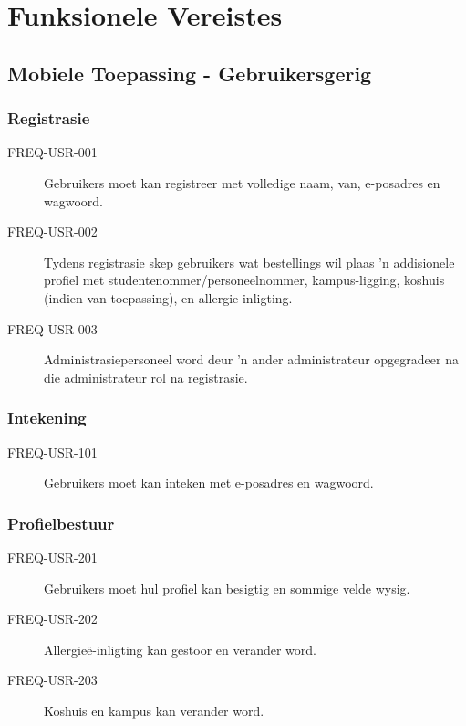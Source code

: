 \section{Funksionele Vereistes}

\subsection{Mobiele Toepassing - Gebruikersgerig}

\subsubsection{Registrasie}
\begin{description}
  \item[FREQ-USR-001] Gebruikers moet kan registreer met volledige naam, van, e-posadres en wagwoord.
  \item[FREQ-USR-002] Tydens registrasie skep gebruikers wat bestellings wil plaas 'n addisionele profiel met studentenommer/personeelnommer, kampus-ligging, koshuis (indien van toepassing), en allergie-inligting.
  \item[FREQ-USR-003] Administrasiepersoneel word deur 'n ander administrateur opgegradeer na die administrateur rol na registrasie.
\end{description}

\subsubsection{Intekening}
\begin{description}
  \item[FREQ-USR-101] Gebruikers moet kan inteken met e-posadres en wagwoord.
\end{description}

\subsubsection{Profielbestuur}
\begin{description}
  \item[FREQ-USR-201] Gebruikers moet hul profiel kan besigtig en sommige velde wysig.
  \item[FREQ-USR-202] Allergieë-inligting kan gestoor en verander word.
  \item[FREQ-USR-203] Koshuis en kampus kan verander word.
\end{description}

